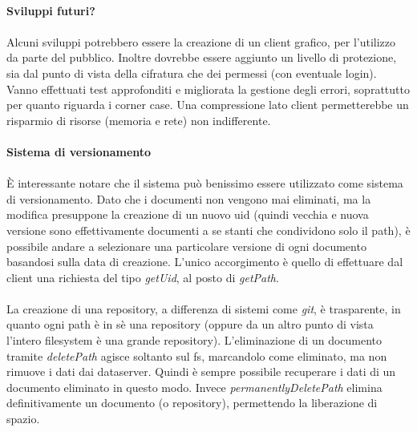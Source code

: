 \documentclass[11pt,a4paper,english]{article}
\begin{document}
\paragraph{Sviluppi futuri?}

\paragraph{} Alcuni sviluppi potrebbero essere la creazione di un client grafico, per l'utilizzo da parte del pubblico. Inoltre dovrebbe essere aggiunto un livello di protezione, sia dal punto di vista della cifratura che dei permessi (con eventuale login). Vanno effettuati test approfonditi e migliorata la gestione degli errori, soprattutto per quanto riguarda i corner case. Una compressione lato client permetterebbe un risparmio di risorse (memoria e rete) non indifferente. 

\paragraph{Sistema di versionamento}

\paragraph{} È interessante notare che il sistema può benissimo essere utilizzato come sistema di versionamento. Dato che i documenti non vengono mai eliminati, ma la modifica presuppone la creazione di un nuovo uid (quindi vecchia e nuova versione sono effettivamente documenti a se stanti che condividono solo il path), è possibile andare a selezionare una particolare versione di ogni documento basandosi sulla data di creazione. L'unico accorgimento è quello di effettuare dal client una richiesta del tipo \emph{getUid}, al posto di \emph{getPath}.

\paragraph{} La creazione di una repository, a differenza di sistemi come \emph{git}, è trasparente, in quanto ogni path è in sè una repository (oppure da un altro punto di vista l'intero filesystem è una grande repository). L'eliminazione di un documento tramite \emph{deletePath} agisce soltanto sul fs, marcandolo come eliminato, ma non rimuove i dati dai dataserver. Quindi è sempre possibile recuperare i dati di un documento eliminato in questo modo. Invece \emph{permanentlyDeletePath} elimina definitivamente un documento (o repository), permettendo la liberazione di spazio. 
\end{document}
